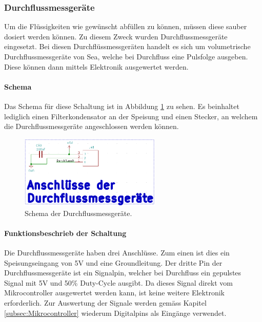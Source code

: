 \subsubsection{Durchflussmessgeräte}
\label{subsubsec:Durchflussmessgeräte}

Um die Flüssigkeiten wie gewünscht abfüllen zu können, müssen diese sauber dosiert werden können. Zu diesem Zweck wurden Durchflussmessgeräte eingesetzt. Bei diesen Durchflüssmessgeräten handelt es sich um volumetrische Durchflussmessgeräte von Sea, welche bei Durchfluss eine Pulsfolge ausgeben. Diese können dann mittels Elektronik ausgewertet werden. \cite{five__tools_store_us_nodate}

\paragraph{Schema}\mbox{}

Das Schema für diese Schaltung ist in Abbildung \ref{fig:Schema_Durchflussmessgeräte} zu sehen. Es beinhaltet lediglich einen Filterkondensator an der Speisung und einen Stecker, an welchem die Durchflussmessgeräte angeschlossen werden können.

\begin{figure}[h!]
	\centering
	\includegraphics[width=0.6\textwidth]{graphics/Schema_Durchflussmessgeraete.png}
	\caption{Schema der Durchflussmessgeräte.}
	\label{fig:Schema_Durchflussmessgeräte}
\end{figure}

\paragraph{Funktionsbeschrieb der Schaltung}\mbox{}

Die Durchflussmessgeräte haben drei Anschlüsse. Zum einen ist dies ein Speisungseingang von 5V und eine Groundleitung. Der dritte Pin der Durchflussmessgeräte ist ein Signalpin, welcher bei Durchfluss ein gepulstes Signal mit 5V und 50\% Duty-Cycle ausgibt. Da dieses Signal direkt vom Mikrocontroller ausgewertet werden kann, ist keine weitere Elektronik erforderlich. Zur Auswertung der Signale werden gemäss Kapitel \ref{subsec:Mikrocontroller} wiederum Digitalpins als Eingänge verwendet. \cite{five__tools_store_us_nodate}  